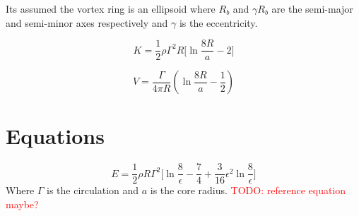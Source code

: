 \documentclass[a4paper,12pt]{article}
\begin{document}
Its assumed the vortex ring is an ellipsoid where $R_b$ and $\gamma R_b$ are the semi-major and semi-minor axes respectively and $\gamma$ is the eccentricity.

\begin{equation}
    K = \frac{1}{2} \rho \Gamma^2 R \bigg[\ln{\frac{8R}{a}} - 2\bigg]
    \label{kinetic_energy}
\end{equation}

\begin{equation}
    V = \frac{\Gamma}{4\pi R} \left( \ln{\frac{8R}{a} - \frac{1}{2}}\right)
    \label{selfinduced_velocity}
\end{equation}


\newpage
\section{Equations}







\vspace{\baselineskip}
\begin{equation}
    E = \frac{1}{2} \rho R \Gamma^{2}\bigg[\ln{\frac{8}{\epsilon}} - \frac{7}{4} + \frac{3}{16} \epsilon^{2} \ln{\frac{8}{\epsilon}} \bigg]
\end{equation}
Where $\Gamma$ is the circulation and $a$ is the core radius.\cite{dynamics_thin_vortexrings}
\textcolor{red}{TODO: reference equation maybe?}
\newpage


\end{document}
